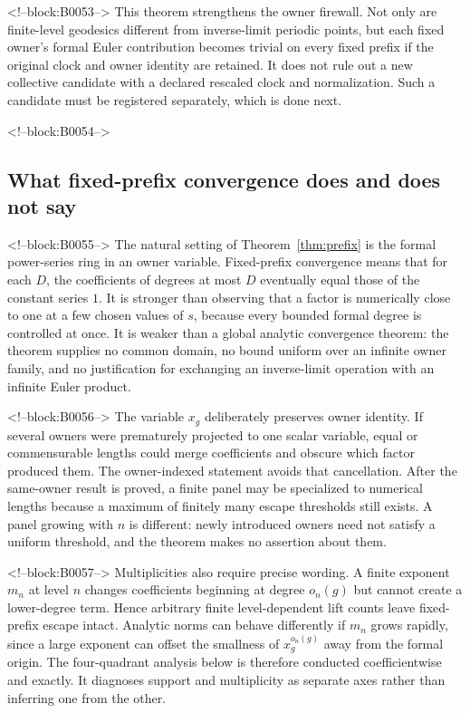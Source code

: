 \documentclass[11pt]{article}
\theoremstyle{definition}
\theoremstyle{remark}
\begin{document}
<!--block:B0053-->
This theorem strengthens the owner firewall. Not only are finite-level geodesics different from inverse-limit periodic points, but each fixed owner's formal Euler contribution becomes trivial on every fixed prefix if the original clock and owner identity are retained. It does not rule out a new collective candidate with a declared rescaled clock and normalization. Such a candidate must be registered separately, which is done next.

<!--block:B0054-->
\subsection{What fixed-prefix convergence does and does not say}

<!--block:B0055-->
The natural setting of Theorem~\ref{thm:prefix} is the formal power-series ring in an owner variable. Fixed-prefix convergence means that for each $D$, the coefficients of degrees at most $D$ eventually equal those of the constant series $1$. It is stronger than observing that a factor is numerically close to one at a few chosen values of $s$, because every bounded formal degree is controlled at once. It is weaker than a global analytic convergence theorem: the theorem supplies no common domain, no bound uniform over an infinite owner family, and no justification for exchanging an inverse-limit operation with an infinite Euler product.

<!--block:B0056-->
The variable $x_g$ deliberately preserves owner identity. If several owners were prematurely projected to one scalar variable, equal or commensurable lengths could merge coefficients and obscure which factor produced them. The owner-indexed statement avoids that cancellation. After the same-owner result is proved, a finite panel may be specialized to numerical lengths because a maximum of finitely many escape thresholds still exists. A panel growing with $n$ is different: newly introduced owners need not satisfy a uniform threshold, and the theorem makes no assertion about them.

<!--block:B0057-->
Multiplicities also require precise wording. A finite exponent $m_n$ at level $n$ changes coefficients beginning at degree $o_n(g)$ but cannot create a lower-degree term. Hence arbitrary finite level-dependent lift counts leave fixed-prefix escape intact. Analytic norms can behave differently if $m_n$ grows rapidly, since a large exponent can offset the smallness of $x_g^{o_n(g)}$ away from the formal origin. The four-quadrant analysis below is therefore conducted coefficientwise and exactly. It diagnoses support and multiplicity as separate axes rather than inferring one from the other.
\end{document}
